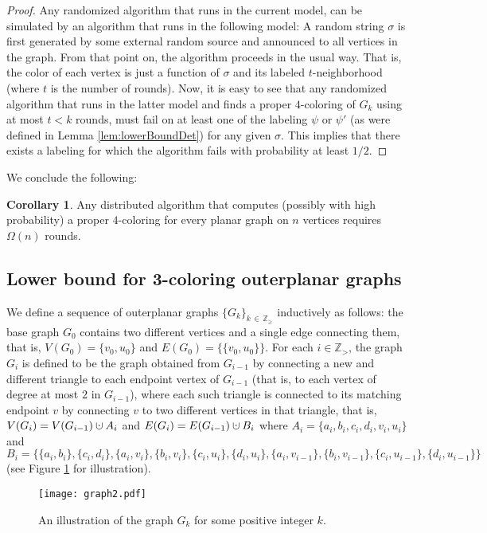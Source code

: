 \documentclass{article}
\theoremstyle{definition}
\newtheorem{corollary}{Corollary}[section]
\def \Z {{\mathbb Z}}
\newcommand{\cupdot}{\mathbin{\mathaccent\cdot\cup}}
\begin{document}
\begin{proof}Any randomized algorithm that runs in the current model, can be simulated by an algorithm that runs in the following model: A random string $\sigma$ is first generated by some external random source and announced to all vertices in the graph. From that point on, the algorithm proceeds in the usual way. That is, the color of each vertex is just a function of $\sigma$ and its labeled $t$-neighborhood (where $t$ is the number of rounds). Now, it is easy to see that any randomized algorithm that runs in the latter model and finds a proper $4$-coloring of $G_k$ using at most $t < k$ rounds, must fail on at least one of the labeling $\psi$ or $\psi'$ (as were defined in Lemma \ref{lem:lowerBoundDet}) for any given $\sigma$. This implies that there exists a labeling for which the algorithm fails with probability at least $1/2$. %
\end{proof}

We conclude the following:

\begin{corollary} Any distributed algorithm that computes (possibly with high probability) a proper $4$-coloring for every planar graph on $n$ vertices requires $\Omega(n)$ rounds. \label{col:lowerBound4Col}\end{corollary}
	
	
\subsection{Lower bound for 3-coloring outerplanar graphs}
        We define a sequence of outerplanar graphs $\{G_k\}_{k \, \in\, \Z_{\ge}}$ inductively as follows: the base graph $G_0$ contains two different vertices and a single edge connecting them, that is, $V(G_0) = \{v_0,u_0\}$ and $E(G_0) = \{\{v_0,u_0\}\}$. For each $i \in \Z_{>}$, the graph $G_i$ is defined to be the graph obtained from $G_{i-1}$ by connecting a new and different triangle to each endpoint vertex of $G_{i-1}$ (that is, to each vertex of degree at most $2$ in $G_{i-1}$), where each such triangle is connected to its matching endpoint $v$ by connecting $v$ to two different vertices in that triangle, that is, $V(G_i) = V(G_{i-1}) \cupdot A_i$ and $E(G_i) = E(G_{i-1}) \cupdot B_i$ where $A_i = \{a_i,b_i,c_i,d_i,v_i,u_i\}$ and $B_i = \{\{a_i,b_i\},\{c_i,d_i\},\{a_i,v_i\},\{b_i,v_i\},\{c_i,u_i\},\{d_i,u_i\},\{a_i,v_{i-1}\},\{b_i,v_{i-1}\},\{c_i,u_{i-1}\},\{d_i,u_{i-1}\}\}$ (see Figure \ref{fig:outerplanar} for illustration).
%
\begin{figure}[ht!]
	\centering
	\texttt{[image: graph2.pdf]}
	\caption{An illustration of the graph $G_k$ for some positive integer $k$.} \label{fig:outerplanar}
\end{figure}
\end{document}
